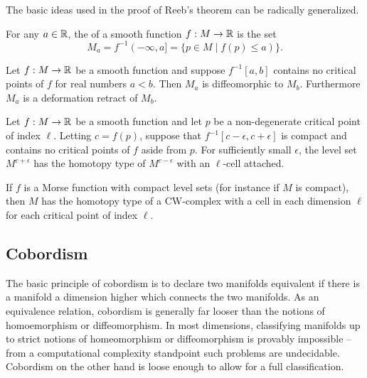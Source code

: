 The basic ideas used in the proof of Reeb's theorem can be radically generalized.

\begin{definition}
	For any $a\in \mathbb{R}$, the  of a smooth function $f : M \to \mathbb{R}$ is the set 
	\[
		M_a = f^{-1}(-\infty, a] = \{ p\in M \mid f(p)\leq a)\}.
	\]
\end{definition}

\begin{figure}
\end{figure}

\begin{theorem}
	Let $f : M \to \mathbb{R}$ be a smooth function and suppose $f^{-1}[a,b]$ contains no critical points of $f$ for real numbers $a<b$. Then $M_a$ is diffeomorphic to $M_b$. Furthermore $M_a$ is a deformation retract of $M_b$.
\end{theorem}

\begin{theorem}
	Let $f : M \to \mathbb{R}$ be a smooth function and let $p$ be a non-degenerate critical point of index $\ell$. Letting $c=f(p)$, suppose that $f^{-1}[c-\epsilon, c+\epsilon]$ is compact and contains no critical points of $f$ aside from $p$. For sufficiently small $\epsilon$, the level set $M^{c+\epsilon}$ has the homotopy type of $M^{c-\epsilon}$ with an $\ell$-cell attached.
\end{theorem}

\begin{theorem}
	If $f$ is a Morse function with compact level sets (for instance if $M$ is compact), then $M$ has the homotopy type of a CW-complex with a cell in each dimension $\ell$ for each critical point of index $\ell$.
\end{theorem}


\subsection{Cobordism}\label{sec:cobordism}

The basic principle of cobordism is to declare two manifolds equivalent if there is a manifold a dimension higher which connects the two manifolds. As an equivalence relation, cobordism is generally far looser than the notions of homoemorphism or diffeomorphism. In most dimensions, classifying manifolds up to strict notions of homeomorphism or diffeomorphism is provably impossible -- from a computational complexity standpoint such problems are undecidable. Cobordism on the other hand is loose enough to allow for a full classification.

